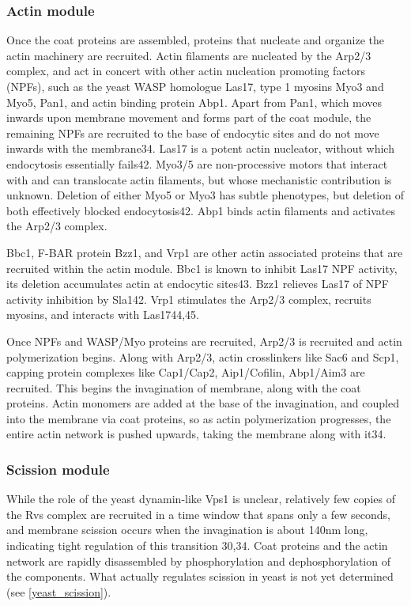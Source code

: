 			\subsubsection{Actin module}
			Once the coat proteins are assembled, proteins that nucleate and organize the actin machinery are recruited. Actin filaments are nucleated by the Arp2/3 complex, and act in concert with other actin nucleation promoting factors (NPFs), such as the yeast WASP homologue Las17, type 1 myosins Myo3 and Myo5, Pan1, and actin binding protein Abp1. Apart from Pan1, which moves inwards upon membrane movement and forms part of the coat module, the remaining NPFs are recruited to the base of endocytic sites and do not move inwards with the membrane34. Las17 is a potent actin nucleator, without which endocytosis essentially fails42. Myo3/5 are non-processive motors that interact with and can translocate actin filaments, but whose mechanistic contribution is unknown. Deletion of either Myo5 or Myo3 has subtle phenotypes, but deletion of both effectively blocked endocytosis42. Abp1 binds actin filaments and activates the Arp2/3 complex. 

			\vspace{5mm}
			Bbc1, F-BAR protein Bzz1, and Vrp1 are other actin associated proteins that are recruited within the actin module. Bbc1 is known to inhibit Las17 NPF activity, its deletion accumulates actin at endocytic sites43. Bzz1 relieves Las17 of NPF activity inhibition by Sla142. Vrp1 stimulates the Arp2/3 complex, recruits myosins, and interacts with Las1744,45. 


			\vspace{5mm}
			Once NPFs and WASP/Myo proteins are recruited, Arp2/3 is recruited and actin polymerization begins. Along with Arp2/3, actin crosslinkers like Sac6 and Scp1, capping protein complexes like Cap1/Cap2, Aip1/Cofilin, Abp1/Aim3 are recruited. This begins the invagination of membrane, along with the coat proteins. Actin monomers are added at the base of the invagination, and coupled into the membrane via coat proteins, so as actin polymerization progresses, the entire actin network is pushed upwards, taking the membrane along with it34.

			\subsubsection{Scission module}
		While the role of the yeast dynamin-like Vps1 is unclear, relatively few copies of the Rvs complex are recruited in a time window that spans only a few seconds, and membrane scission occurs when the invagination is about 140nm long, indicating tight regulation of this transition 30,34. Coat proteins and the actin network are rapidly disassembled by phosphorylation and dephosphorylation of the components.  What actually regulates scission in yeast is not yet determined (see \ref{yeast_scission}).

